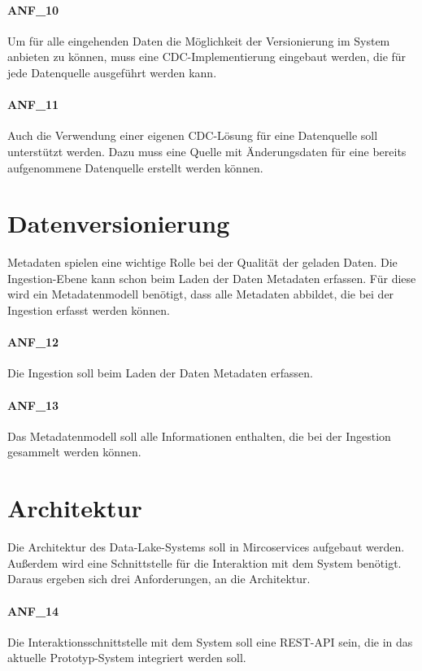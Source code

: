 \paragraph{ANF\_10}
\label{ANF_10}
Um für alle eingehenden Daten die Möglichkeit der Versionierung im System anbieten zu können, muss eine CDC-Implementierung eingebaut werden, die für jede Datenquelle ausgeführt werden kann.

\paragraph{ANF\_11}
\label{ANF_11}
Auch die Verwendung einer eigenen CDC-Lösung für eine Datenquelle soll unterstützt werden.
Dazu muss eine Quelle mit Änderungsdaten für eine bereits aufgenommene Datenquelle erstellt werden können.

\section{Datenversionierung}
\label{sec:anf-metadata}
Metadaten spielen eine wichtige Rolle bei der Qualität der geladen Daten.
Die Ingestion-Ebene kann schon beim Laden der Daten Metadaten erfassen.
Für diese wird ein Metadatenmodell benötigt, dass alle Metadaten abbildet, die bei der Ingestion erfasst werden können.

\paragraph{ANF\_12}
\label{ANF_12}
Die Ingestion soll beim Laden der Daten Metadaten erfassen.

\paragraph{ANF\_13}
\label{ANF_13}
Das Metadatenmodell soll alle Informationen enthalten, die bei der Ingestion gesammelt werden können.

\section{Architektur}
\label{sec:anf-arch}
Die Architektur des Data-Lake-Systems soll in Mircoservices aufgebaut werden.
Außerdem wird eine Schnittstelle für die Interaktion mit dem System benötigt.
Daraus ergeben sich drei Anforderungen, an die Architektur.

\paragraph{ANF\_14}
\label{ANF_14}
Die Interaktionsschnittstelle mit dem System soll eine REST-API sein, die in das aktuelle Prototyp-System integriert werden soll.


